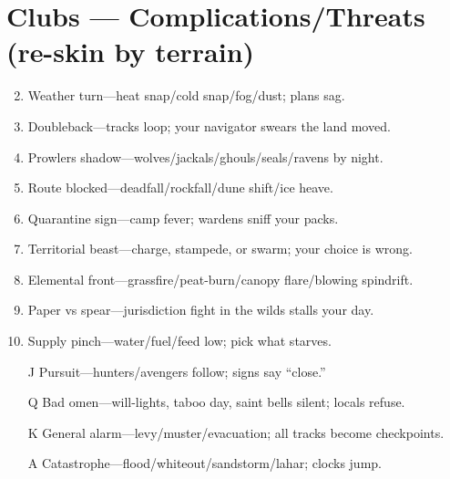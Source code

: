 \section*{Clubs --- Complications/Threats (re-skin by terrain)}
\label{sec:wilderness-complications}
\begin{enumerate}
\setcounter{enumi}{1}
\item Weather turn---heat snap/cold snap/fog/dust; plans sag.
\item Doubleback---tracks loop; your navigator swears the land moved.
\item Prowlers shadow---wolves/jackals/ghouls/seals/ravens by night.
\item Route blocked---deadfall/rockfall/dune shift/ice heave.
\item Quarantine sign---camp fever; wardens sniff your packs.
\item Territorial beast---charge, stampede, or swarm; your choice is wrong.
\item Elemental front---grassfire/peat-burn/canopy flare/blowing spindrift.
\item Paper vs spear---jurisdiction fight in the wilds stalls your day.
\item Supply pinch---water/fuel/feed low; pick what starves.
\item[J] Pursuit---hunters/avengers follow; signs say ``close.''
\item[Q] Bad omen---will-lights, taboo day, saint bells silent; locals refuse.
\item[K] General alarm---levy/muster/evacuation; all tracks become checkpoints.
\item[A] Catastrophe---flood/whiteout/sandstorm/lahar; clocks jump.
\end{enumerate}

